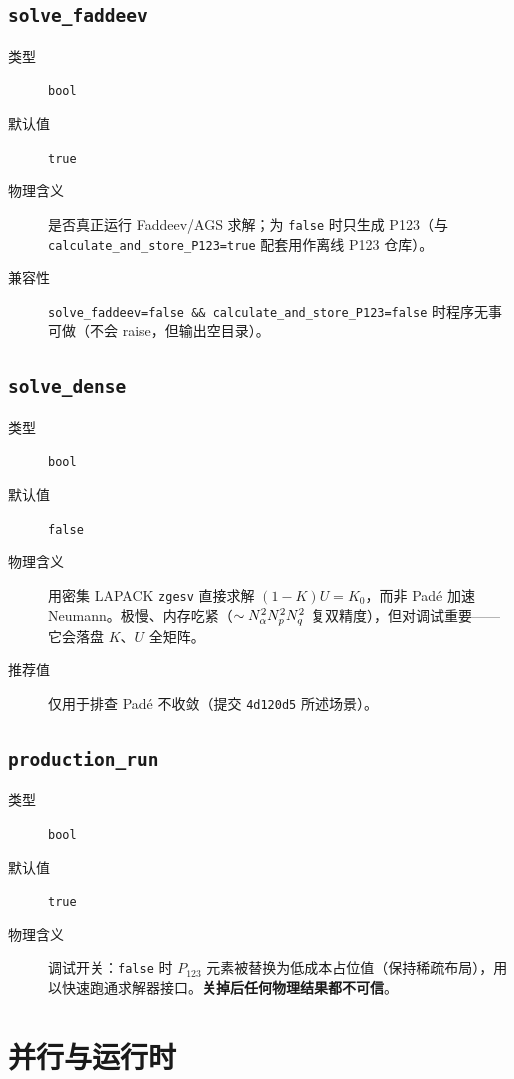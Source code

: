 \subsection{\texttt{solve\_faddeev}}

\begin{description}
  \item[类型] \texttt{bool}
  \item[默认值] \texttt{true}
  \item[物理含义] 是否真正运行 Faddeev/AGS 求解；为 \texttt{false} 时只生成 P123（与 \texttt{calculate\_and\_store\_P123=true} 配套用作离线 P123 仓库）。
  \item[兼容性] \texttt{solve\_faddeev=false \&\& calculate\_and\_store\_P123=false} 时程序无事可做（不会 raise，但输出空目录）。
\end{description}

\subsection{\texttt{solve\_dense}}

\begin{description}
  \item[类型] \texttt{bool}
  \item[默认值] \texttt{false}
  \item[物理含义] 用密集 LAPACK \texttt{zgesv} 直接求解 \((1-K)U=K_0\)，而非 Padé 加速 Neumann。极慢、内存吃紧（\(\sim N_\alpha^2 N_p^2 N_q^2\) 复双精度），但对调试重要——它会落盘 \(K\)、\(U\) 全矩阵。
  \item[推荐值] 仅用于排查 Padé 不收敛（提交 \texttt{4d120d5} 所述场景）。
\end{description}

\subsection{\texttt{production\_run}}

\begin{description}
  \item[类型] \texttt{bool}
  \item[默认值] \texttt{true}
  \item[物理含义] 调试开关：\texttt{false} 时 \(P_{123}\) 元素被替换为低成本占位值（保持稀疏布局），用以快速跑通求解器接口。\textbf{关掉后任何物理结果都不可信}。
\end{description}

\section{并行与运行时}
\label{sec:appE_runtime}

